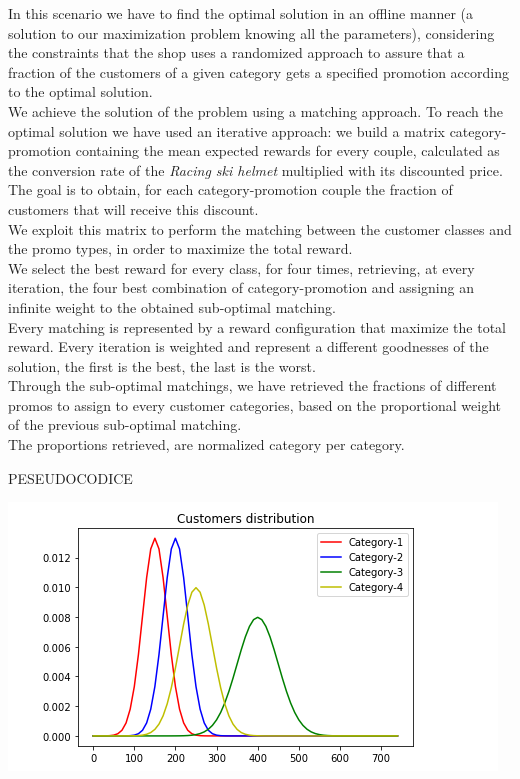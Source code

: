 In this scenario we have to find the optimal solution in an offline manner (a solution to our maximization problem knowing all the parameters), considering the constraints that the shop uses a randomized approach to assure that a fraction of the customers of a given category gets a specified promotion according to the optimal solution.\\
We achieve the solution of the problem using a matching approach. 
To reach the optimal solution we have used an iterative approach: we build a matrix category-promotion containing the mean expected rewards for every couple, calculated as the conversion rate of the \textit{Racing ski helmet} multiplied with its discounted price.
The goal is to obtain, for each category-promotion couple the fraction of customers that will receive this discount.\\
We exploit this matrix to perform the matching between the customer classes and the promo types, in order to maximize the total reward. \\
We select the best reward for every class, for four times, retrieving, at every iteration, the four best combination of category-promotion and assigning an infinite weight to the obtained sub-optimal matching.\\
Every matching is represented by a reward configuration that maximize the total reward. Every iteration is weighted and represent a different goodnesses of the solution, the first is the best, the last is the worst.\\
Through the sub-optimal matchings, we have retrieved the fractions of different promos to assign to every customer categories, based on the proportional weight of the previous sub-optimal matching.\\
The proportions retrieved, are normalized category per category.

PESEUDOCODICE

\begin{center}
	\includegraphics[scale=1]{Images/CustomerDistribution}
\end{center}





